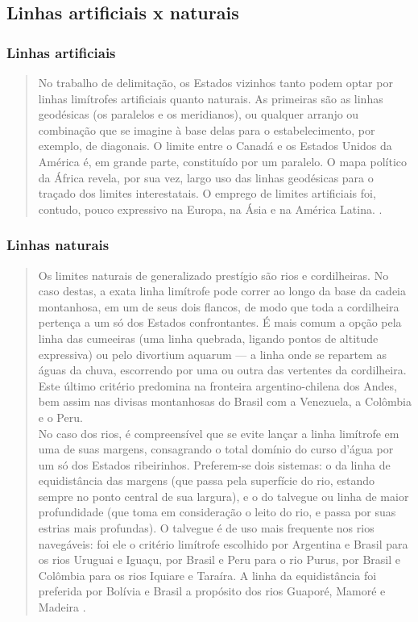 \documentclass{article}
\begin{document}
\subsection{Linhas artificiais x naturais}

\subsubsection{Linhas artificiais}

\begin{quote}
    No trabalho de delimitação, os Estados vizinhos tanto podem optar por linhas limítrofes artificiais quanto naturais. As primeiras são as linhas geodésicas (os paralelos e os meridianos), ou qualquer arranjo ou combinação que se imagine à base delas para o estabelecimento, por exemplo, de diagonais. O limite entre o Canadá e os Estados Unidos da América é, em grande parte, constituído por um paralelo. O mapa político da África revela, por sua vez, largo uso das linhas geodésicas para o traçado dos limites interestatais. O emprego de limites artificiais foi, contudo, pouco expressivo na Europa, na Ásia e na América Latina. \cite[p.~74]{rezek_direito_2024}.
\end{quote}

\subsubsection{Linhas naturais}

\begin{quote}
    Os limites naturais de generalizado prestígio são rios e cordilheiras. No caso destas, a exata linha limítrofe pode correr ao longo da base da cadeia montanhosa, em um de seus dois flancos, de modo que toda a cordilheira pertença a um só dos Estados confrontantes. É mais comum a opção pela linha das cumeeiras (uma linha quebrada, ligando pontos de altitude expressiva) ou pelo divortium aquarum — a linha onde se repartem as águas da chuva, escorrendo por uma ou outra das vertentes da cordilheira. Este último critério predomina na fronteira argentino-chilena dos Andes, bem assim nas divisas montanhosas do Brasil com a Venezuela, a Colômbia e o Peru.
    \\No caso dos rios, é compreensível que se evite lançar a linha limítrofe em uma de suas margens, consagrando o total domínio do curso d’água por um só dos Estados ribeirinhos. Preferem-se dois sistemas: o da linha de equidistância das margens (que passa pela superfície do rio, estando sempre no ponto central de sua largura), e o do talvegue ou linha de maior profundidade (que toma em consideração o leito do rio, e passa por suas estrias mais profundas). O talvegue é de uso mais frequente nos rios navegáveis: foi ele o critério limítrofe escolhido por Argentina e Brasil para os rios Uruguai e Iguaçu, por Brasil e Peru para o rio Purus, por Brasil e Colômbia para os rios Iquiare e Taraíra. A linha da equidistância foi preferida por Bolívia e Brasil a propósito dos rios Guaporé, Mamoré e Madeira \cite[p.~74]{rezek_direito_2024}.
\end{quote}

\printbibliography
\end{document}
